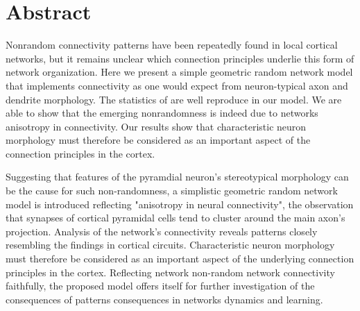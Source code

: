 \section*{Abstract}
%
Nonrandom connectivity patterns have been repeatedly found in local cortical
networks, but it remains unclear which connection principles underlie this form of network organization. Here we present a simple geometric random network model that implements connectivity as one would expect from neuron-typical axon and dendrite morphology. The statistics of are well reproduce in our model. We are able to show that the emerging nonrandomness is indeed due to networks anisotropy in connectivity. Our results show that characteristic neuron morphology must therefore be considered as an important aspect of the connection principles in the cortex.



Suggesting that features of the pyramdial neuron's
stereotypical morphology can be the cause for such non-randomness, a
simplistic geometric random network model is introduced reflecting
"anisotropy in neural connectivity", the observation that synapses of
cortical pyramidal cells tend to cluster around the main axon's
projection. Analysis of the network's connectivity reveals patterns
closely resembling the findings in cortical circuits. Characteristic
neuron morphology must therefore be considered as an important aspect
of the underlying connection principles in the cortex. Reflecting
network non-random network connectivity faithfully, the proposed model
offers itself for further investigation of the consequences of
patterns consequences in networks dynamics and learning.


